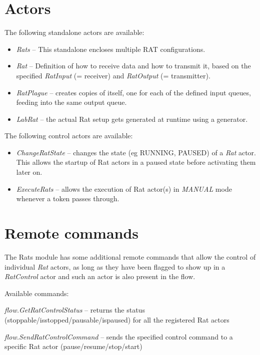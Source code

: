 \documentclass[a4paper]{book}
\begin{document}
\section{Actors}
The following standalone actors are available:
\begin{itemize}
	\item \textit{Rats} -- This standalone encloses multiple RAT configurations.
	\item \textit{Rat} -- Definition of how to receive data and how to transmit 
	it, based on the specified \textit{RatInput} (= receiver) and 
	\textit{RatOutput} (= transmitter).
	\item \textit{RatPlague} -- creates copies of itself, one for each of
	the defined input queues, feeding into the same output queue.
	\item \textit{LabRat} -- the actual Rat setup gets generated at runtime
	using a generator.
\end{itemize}
The following control actors are available:
\begin{itemize}
	\item \textit{ChangeRatState} -- changes the state (eg RUNNING, PAUSED)
	of a \textit{Rat} actor. This allows the startup of Rat actors in a
	paused state before activating them later on.
	\item \textit{ExecuteRats} -- allows the execution of Rat actor(s) in
	\textit{MANUAL} mode whenever a token passes through.
\end{itemize}


\section{Remote commands}
The Rats module has some additional remote commands that allow the control of
individual \textit{Rat} actors, as long as they have been flagged to show up in a
\textit{RatControl} actor and such an actor is also present in the flow.

Available commands:
\begin{tight_itemize}
  \item \textit{flow.GetRatControlStatus} -- returns the status
  (stoppable/isstopped/pausable/ispaused) for all the registered Rat actors
  \item \textit{flow.SendRatControlCommand} -- sends the specified control command
  to a specific Rat actor (pause/resume/stop/start)
\end{tight_itemize}


\end{document}
